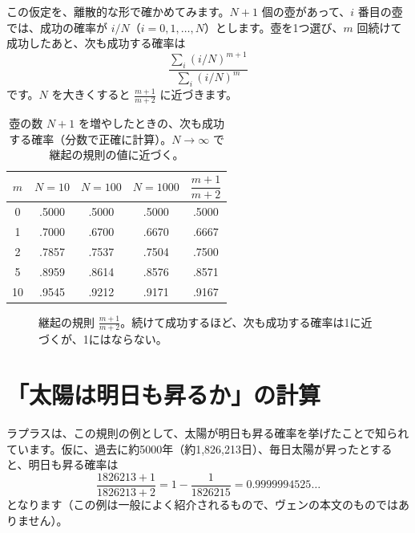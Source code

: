 \documentclass[a4paper,11pt,openany]{ltjsbook}
\begin{document}
この仮定を、離散的な形で確かめてみます。$N+1$ 個の壺があって、$i$ 番目の壺では、成功の確率が $i/N$（$i=0,1,\ldots,N$）とします。壺を1つ選び、$m$ 回続けて成功したあと、次も成功する確率は
\[
\frac{\sum_{i}(i/N)^{m+1}}{\sum_{i}(i/N)^{m}}
\]
です。$N$ を大きくすると $\frac{m+1}{m+2}$ に近づきます。

\begin{table}[htbp]
\centering
\begin{tabular}{c|ccc|c}
\toprule
$m$ & $N=10$ & $N=100$ & $N=1000$ & $\dfrac{m+1}{m+2}$\\
\midrule
0 & .5000 & .5000 & .5000 & .5000\\
1 & .7000 & .6700 & .6670 & .6667\\
2 & .7857 & .7537 & .7504 & .7500\\
5 & .8959 & .8614 & .8576 & .8571\\
10 & .9545 & .9212 & .9171 & .9167\\
\bottomrule
\end{tabular}
\caption{壺の数 $N+1$ を増やしたときの、次も成功する確率（分数で正確に計算）。$N\to\infty$ で継起の規則の値に近づく。}
\end{table}

\begin{figure}[htbp]
\centering
{}
\caption{継起の規則 $\frac{m+1}{m+2}$。続けて成功するほど、次も成功する確率は1に近づくが、1にはならない。}
\end{figure}

\section{「太陽は明日も昇るか」の計算}

ラプラスは、この規則の例として、太陽が明日も昇る確率を挙げたことで知られています。仮に、過去に約5000年（約1,826,213日）、毎日太陽が昇ったとすると、明日も昇る確率は
\[
\frac{1826213+1}{1826213+2}=1-\frac{1}{1826215}=0.9999994525\ldots
\]
となります（この例は一般によく紹介されるもので、ヴェンの本文のものではありません）。
\end{document}
